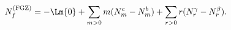 \begin{equation}
%
N^{\rm (FGZ)}_{f} = -\Lm{0} + \sum_{m>0} m ( N_{m}^{c} -
N_{m}^{b} ) + \sum_{r>0} r ( N_{r}^{\gamma} -
N_{r}^{\beta} ).
\label{eq:fgz}
%
\end{equation}


